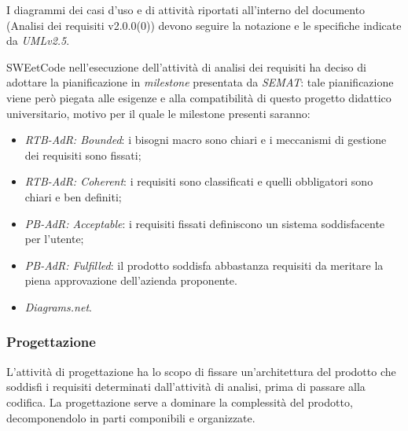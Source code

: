 \documentclass[10pt, a4paper]{article}
\begin{document}
I diagrammi dei casi d'uso e di attività riportati all'interno del documento (Analisi dei requisiti v2.0.0(0)) devono seguire la notazione e le specifiche indicate da \textit{UML\pg v2.5}.

SWEetCode nell'esecuzione dell'attività di analisi dei requisiti ha deciso di adottare la pianificazione in \textit{milestone\pg} presentata 
da \textit{SEMAT}: tale pianificazione viene però piegata alle esigenze e alla compatibilità di questo progetto didattico universitario, motivo per il quale le milestone presenti saranno:
\begin{itemize}
    \item \textit{RTB-AdR: Bounded}: i bisogni macro sono chiari e i meccanismi di gestione dei requisiti sono fissati;
    \item \textit{RTB-AdR: Coherent}: i requisiti sono classificati e quelli obbligatori sono chiari e ben definiti;
    \item \textit{PB-AdR: Acceptable}: i requisiti fissati definiscono un sistema soddisfacente per l'utente;
    \item \textit{PB-AdR: Fulfilled}: il prodotto soddisfa abbastanza requisiti da meritare la piena approvazione dell'azienda proponente. 
\end{itemize}

\begin{itemize}
    \item \textit{Diagrams.net}.
\end{itemize}

\subsubsection{Progettazione}
L'attività di progettazione ha lo scopo di fissare un'architettura del prodotto che soddisfi i requisiti determinati dall'attività di analisi, prima di passare alla codifica.
La progettazione serve a dominare la complessità del prodotto, decomponendolo in parti componibili e organizzate.
\end{document}
